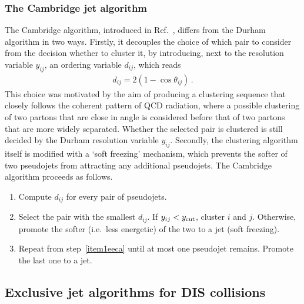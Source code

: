 \subsubsection{The Cambridge jet algorithm}
\label{sec:cam-ee}
The Cambridge algorithm, introduced in
Ref.~\cite{Dokshitzer:1997in}, differs from the Durham algorithm in two ways. Firstly, it decouples the choice of which pair to consider from the decision whether to cluster it, by introducing, next to the resolution variable $y_{ij}$, an ordering variable $d_{ij}$, which reads
\begin{align}
	d_{i j} = 2 (1 - \cos \theta_{i j})\,.
\end{align}
This choice was motivated by the aim of producing a clustering sequence that closely follows the coherent pattern of QCD radiation, where a possible clustering of two partons that are close in angle is considered before that of two partons that are more widely separated. 
%
Whether the selected pair is clustered is still decided by the Durham resolution variable $y_{ij}$.
%
Secondly, the clustering algorithm itself is modified with a `soft freezing' mechanism, which prevents the softer of two pseudojets from attracting any additional pseudojets.
%
The Cambridge algorithm proceeds as follows. 
\begin{enumerate}
	\item \label{item1eeca} Compute $d_{ij}$ for every pair of pseudojets.
	\item Select the pair with the smallest $d_{ij}$. If
	$y_{ij}<y_{\rm cut}$, cluster $i$ and $j$. Otherwise, promote the
	softer (i.e.\ less energetic) of the two to a jet (soft freezing).
	\item Repeat from step~\ref{item1eeca} until at most one pseudojet remains. Promote the last one to a jet.
\end{enumerate} 




\subsection{Exclusive jet algorithms for DIS collisions}
